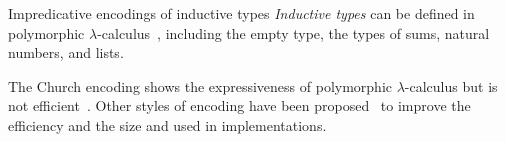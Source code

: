 %
%
%  

\begin{frame}{Impredicative encodings of inductive types} 
  \emph{Inductive types} can be defined in polymorphic $\lambda$-calculus~\cite{Bohm1985}, including the empty type, the types of sums, natural numbers, and lists.

  The Church encoding shows the expressiveness of polymorphic $\lambda$-calculus but is not efficient~\cite{Koopman2014}.
  Other styles of encoding have been proposed~\cite{Firsov2018} to improve the efficiency and the size and used in implementations.
\end{frame}

%


